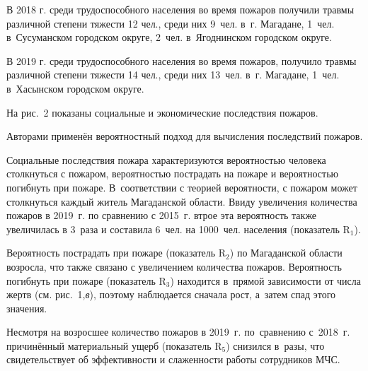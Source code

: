 В 2018 г. среди трудоспособного населения во время пожаров получили травмы различной степени тяжести 12 чел., среди них 9~чел. в~г. Магадане, 1~чел. в~Сусуманском городском округе, 2~чел. в~Ягоднинском городском округе.

В 2019 г. среди трудоспособного населения во время пожаров, получило травмы различной степени тяжести 14 чел., среди них 13~чел. в~г. Магадане, 1~чел. в~Хасынском городском округе.

На рис.~2 показаны социальные и экономические последствия пожаров.



Авторами применён вероятностный подход для вычисления последствий
пожаров.

Социальные последствия пожара характеризуются вероятностью человека
столкнуться с пожаром, вероятностью пострадать на пожаре и вероятностью
погибнуть при пожаре. В~соответствии с теорией вероятности, с пожаром
может столкнуться каждый житель Магаданской области. Ввиду увеличения
количества пожаров в 2019~г. по сравнению с 2015~г. втрое эта
вероятность также увеличилась в 3~раза и составила 6~чел. на 1000~чел.
населения (показатель R$_1$).

Вероятность пострадать при пожаре (показатель R$_2$) по Магаданской
области возросла, что также связано с увеличением количества пожаров.
Вероятность погибнуть при пожаре (показатель R$_3$) находится в~прямой
зависимости от числа жертв (см. рис.~1,\textit{в}), поэтому наблюдается сначала
рост, а~затем спад этого значения.

Несмотря на возросшее количество пожаров в 2019~г. по~сравнению с~2018~г. причинённый материальный ущерб (показатель R$_5$) снизился в~разы, что свидетельствует об эффективности и слаженности работы сотрудников МЧС.

